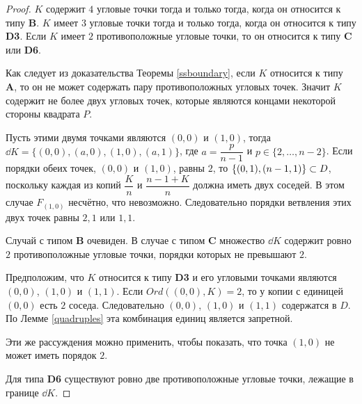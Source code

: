 \begin{proof}
$K$ содержит $4$ угловые точки тогда и только тогда, когда он относится к типу {\bf B}. 
$K$  имеет $3$ угловые точки тогда и только тогда, когда он относится к типу {\bf D3}. 
Если $K$ имеет $2$ противоположные угловые точки, то он относится к типу {\bf C} или {\bf D6}.

Как следует из доказательства Теоремы \ref{ssboundary}, если $K$ относится к типу {\bf A}, то он не может содержать пару противоположных угловых точек. 
Значит $K$ содержит не более двух угловых точек, которые являются концами некоторой стороны квадрата $P$. 

Пусть этими двумя точками являются $(0,0)$ и $(1,0)$, тогда $\dd K=\{(0,0), (a,0), (1,0), (a,1)\}$, где $a=\dfrac{p}{n-1}$ и $p\in \{2, \ldots, n-2\}$. 
Если порядки обеих точек, $(0,0)$ и $(1,0)$,  равны $2$, то $\{(0,1), (n-1,1)\}\subset D$, поскольку каждая из копий $\dfrac{K}{n}$ и $\dfrac{n-1+K}{n}$ должна иметь двух соседей. 
В этом случае $F_{(1,0)}$ несчётно, что невозможно.
Следовательно порядки ветвления этих двух точек равны $2,1$ или $1,1$.

Случай с типом {\bf B} очевиден.
В случае с типом {\bf C} множество $\dd K$ содержит ровно $2$ противоположные угловые точки, порядки которых не превышают $2$.

Предположим, что $K$ относится к типу {\bf D3} и его угловыми точками являются $(0,0)$, $(1,0)$ и $(1,1)$. 
Если $Ord((0,0),K)=2$, то у копии с единицей $(0,0)$ есть $2$ соседа. 
Следовательно $(0,0)$, $(1,0)$ и $(1,1)$ содержатся в  $D$. 
По Лемме \ref{quadruples} эта комбинация единиц является запретной.

Эти же рассуждения можно применить, чтобы показать, что точка $(1,0)$ не может иметь порядок $2$.

Для типа {\bf D6} существуют ровно две противоположные угловые точки, лежащие в границе $\dd K$. 
\end{proof} 


